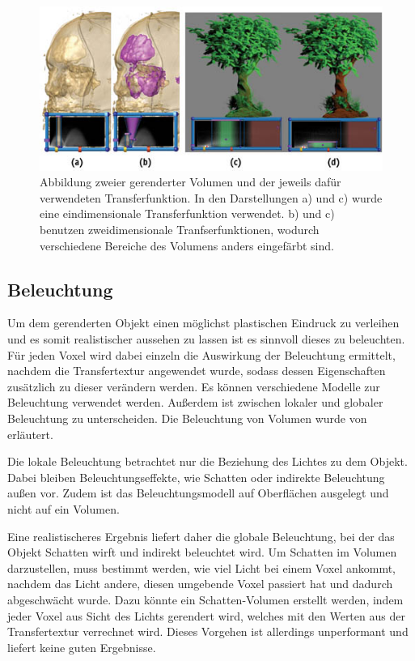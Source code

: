 \begin{figure}[!htb]
	\centering
	\includegraphics[width=0.7\linewidth]{images/transferfunction.jpg}
	\caption{Abbildung zweier gerenderter Volumen und der jeweils dafür verwendeten Transferfunktion. In den Darstellungen a) und c) wurde eine eindimensionale Transferfunktion verwendet. b) und c) benutzen zweidimensionale Tranfserfunktionen, wodurch verschiedene Bereiche des Volumens anders eingefärbt sind.}
	\label{img:transferfunction}
\end{figure}
\FloatBarrier


\subsection{Beleuchtung}
\label{beleuchtung}

Um dem gerenderten Objekt einen möglichst plastischen Eindruck zu verleihen und es somit realistischer aussehen zu lassen ist es sinnvoll dieses zu beleuchten. 
Für jeden Voxel wird dabei einzeln die Auswirkung der Beleuchtung ermittelt, nachdem die  Transfertextur angewendet wurde, sodass dessen Eigenschaften zusätzlich zu dieser verändern werden. Es können verschiedene Modelle zur Beleuchtung verwendet werden. Außerdem ist zwischen lokaler und globaler Beleuchtung zu unterscheiden. Die Beleuchtung von Volumen wurde von \cite{Fernando04} erläutert.

Die lokale Beleuchtung betrachtet nur die Beziehung des Lichtes zu dem Objekt. Dabei bleiben Beleuchtungseffekte, wie Schatten oder indirekte Beleuchtung außen vor. Zudem ist das Beleuchtungsmodell auf Oberflächen ausgelegt und nicht auf ein Volumen. 

Eine realistischeres Ergebnis liefert daher die globale Beleuchtung, bei der das Objekt Schatten wirft und indirekt beleuchtet wird. 
Um Schatten im Volumen darzustellen, muss bestimmt werden, wie viel Licht bei einem Voxel ankommt, nachdem das Licht andere, diesen umgebende Voxel passiert hat und dadurch abgeschwächt wurde. 
Dazu könnte ein Schatten-Volumen erstellt werden, indem jeder Voxel aus Sicht des Lichts gerendert wird, welches mit den Werten aus der Transfertextur verrechnet wird. Dieses Vorgehen ist allerdings unperformant und liefert keine guten Ergebnisse.

